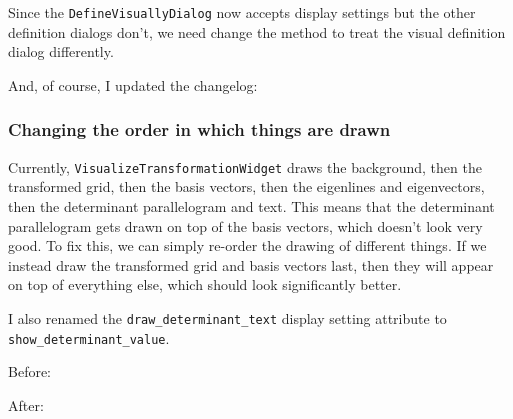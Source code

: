 \documentclass[../development.tex]{subfiles}
\begin{document}


Since the \texttt{DefineVisuallyDialog} now accepts display settings but the other definition dialogs don't, we need change the  method to treat the visual definition dialog differently.


And, of course, I updated the changelog:


\subsubsection{Changing the order in which things are drawn\label{development:making-v0.2.2:changing-the-order-in-which-things-are-drawn}}

Currently, \texttt{VisualizeTransformationWidget} draws the background, then the transformed grid, then the basis vectors, then the eigenlines and eigenvectors, then the determinant parallelogram and text. This means that the determinant parallelogram gets drawn on top of the basis vectors, which doesn't look very good. To fix this, we can simply re-order the drawing of different things. If we instead draw the transformed grid and basis vectors last, then they will appear on top of everything else, which should look significantly better.

I also renamed the \texttt{draw\_determinant\_text} display setting attribute to \texttt{show\_determinant\_value}.

Before:

After:
\end{document}
